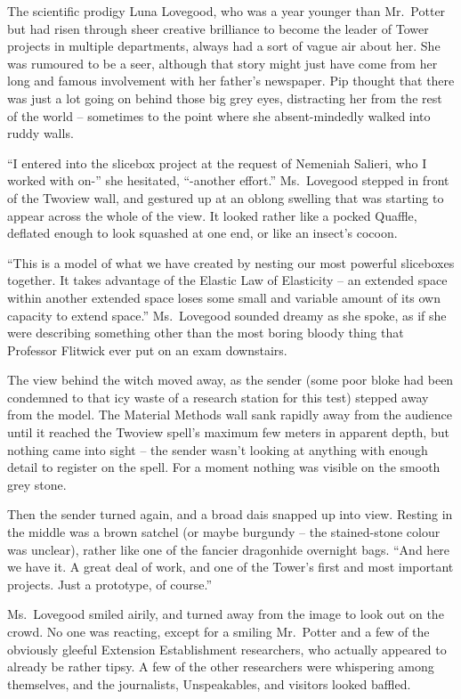 The scientific prodigy Luna Lovegood, who was a year younger than
Mr.~Potter but had risen through sheer creative brilliance to become the
leader of Tower projects in multiple departments, always had a sort of
vague air about her. She was rumoured to be a seer, although that story
might just have come from her long and famous involvement with her
father's newspaper. Pip thought that there was just a lot going on
behind those big grey eyes, distracting her from the rest of the world
-- sometimes to the point where she absent-mindedly walked into ruddy
walls.

``I entered into the slicebox project at the request of Nemeniah
Salieri, who I worked with on-'' she hesitated, ``-another effort.''
Ms.~Lovegood stepped in front of the Twoview wall, and gestured up at an
oblong swelling that was starting to appear across the whole of the
view. It looked rather like a pocked Quaffle, deflated enough to look
squashed at one end, or like an insect's cocoon.

``This is a model of what we have created by nesting our most powerful
sliceboxes together. It takes advantage of the Elastic Law of Elasticity
-- an extended space within another extended space loses some small and
variable amount of its own capacity to extend space.'' Ms.~Lovegood
sounded dreamy as she spoke, as if she were describing something other
than the most boring bloody thing that Professor Flitwick ever put on an
exam downstairs.

The view behind the witch moved away, as the sender (some poor bloke had
been condemned to that icy waste of a research station for this test)
stepped away from the model. The Material Methods wall sank rapidly away
from the audience until it reached the Twoview spell's maximum few
meters in apparent depth, but nothing came into sight -- the sender
wasn't looking at anything with enough detail to register on the spell.
For a moment nothing was visible on the smooth grey stone.

Then the sender turned again, and a broad dais snapped up into view.
Resting in the middle was a brown satchel (or maybe burgundy -- the
stained-stone colour was unclear), rather like one of the fancier
dragonhide overnight bags. ``And here we have it. A great deal of work,
and one of the Tower's first and most important projects. Just a
prototype, of course.''

Ms.~Lovegood smiled airily, and turned away from the image to look out
on the crowd. No one was reacting, except for a smiling Mr.~Potter and a
few of the obviously gleeful Extension Establishment researchers, who
actually appeared to already be rather tipsy. A few of the other
researchers were whispering among themselves, and the journalists,
Unspeakables, and visitors looked baffled.


